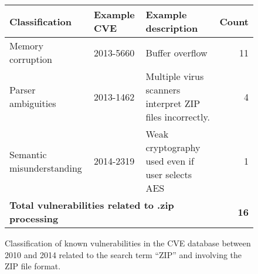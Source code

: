 \begin{figure*}
\centering
\begin{tabular}{lllr}
\toprule
 \bf Classification & \bf Example CVE & \bf Example description & \bf Count\\
\midrule
  Memory corruption & 2013-5660 & Buffer overflow & 11\\
  Parser ambiguities & 2013-1462 & Multiple virus scanners interpret ZIP files incorrectly.& 4\\
  Semantic misunderstanding & 2014-2319 & Weak cryptography used even if user selects AES & 1\\
  \multicolumn{3}{l}{\bf Total vulnerabilities related to .zip processing }& \bf 16  \\
\bottomrule
  
\end{tabular}
\caption{Classification of known vulnerabilities in the CVE database
between 2010 and 2014 related to the search term ``ZIP'' and involving
the ZIP file format.}
\label{fig:motivation} 
\end{figure*}
